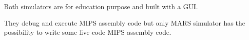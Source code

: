 \documentclass[
  oneside,
  11pt, a4paper,
  footinclude=true,
  headinclude=true,
  cleardoublepage=empty
]{scrbook}
\begin{document}
Both simulators are for education purpose and built with a GUI.

They debug and execute MIPS assembly code but only MARS simulator has the possibility to write some live-code MIPS assembly code.






\newpage

\end{document}
